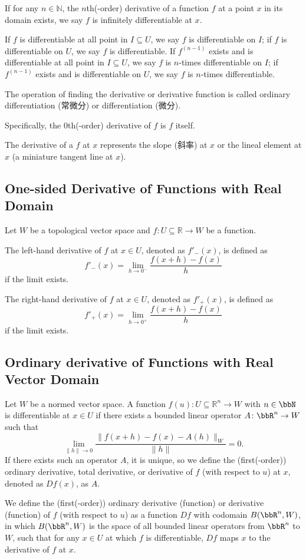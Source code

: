 \documentclass[a4paper,12pt]{report}
\begin{document}
\begin{itemize}
\begin{itemize}
If for any $n\in\mathbb{N}$, the $n$th(-order) derivative of a function $f$ at a point $x$ in its domain exists, we say $f$ is infinitely differentiable at $x$.

If $f$ is differentiable at all point in $I\subseteq U$, we say $f$ is differentiable on $I$; if $f$ is differentiable on $U$, we say $f$ is differentiable. If $f^{(n-1)}$ exists and is differentiable at all point in $I\subseteq U$, we say $f$ is $n$-times differentiable on $I$; if $f^{(n-1)}$ exists and is differentiable on $U$, we say $f$ is $n$-times differentiable.

The operation of finding the derivative or derivative function is called ordinary differentiation (常微分) or differentiation (微分).

Specifically, the $0$th(-order) derivative of $f$ is $f$ itself.

The derivative of a $f$ at $x$ represents the slope (斜率) at $x$ or the lineal element at $x$ (a miniature tangent line at $x$).
\subsection{One-sided Derivative of Functions with Real Domain}
Let $W$ be a topological vector space and $f\colon U\subseteq\mathbb{R}\to W$ be a function.

The left-hand derivative of $f$ at $x\in U$, denoted as $f'_-(x)$, is defined as
\[f'_-(x)=\lim_{h\to 0^-}\frac{f(x+h)-f(x)}{h}\]
if the limit exists.

The right-hand derivative of $f$ at $x\in U$, denoted as $f'_+(x)$, is defined as
\[f'_+(x)=\lim_{h\to 0^+}\frac{f(x+h)-f(x)}{h}\]
if the limit exists.
\subsection{Ordinary derivative of Functions with Real Vector Domain}
Let $W$ be a normed vector space. A function $f(u)\colon U\subseteq\mathbb{R}^n\to W$ with $n\in\bbN$ is differentiable at $x\in U$ if there exists a bounded linear operator $A\colon\bbR^n\to W$ such that
\[\lim_{\|h\|\to 0}\frac{\|f(x+h)-f(x)-A(h)\|_W}{\|h\|}=0.\]
If there exists such an operator $A$, it is unique, so we define the (first(-order)) ordinary derivative, total derivative, or derivative of $f$ (with respect to $u$) at $x$, denoted as $Df(x)$, as $A$.

We define the (first(-order)) ordinary derivative (function) or derivative (function) of $f$ (with respect to $u$) as a function $Df$ with codomain $B(\bbR^n,W)$, in which $B(\bbR^n,W)$ is the space of all bounded linear operators from $\bbR^n$ to $W$, such that for any $x\in U$ at which $f$ is differentiable, $Df$ maps $x$ to the derivative of $f$ at $x$.


\end{itemize}
\end{itemize}
\end{document}
